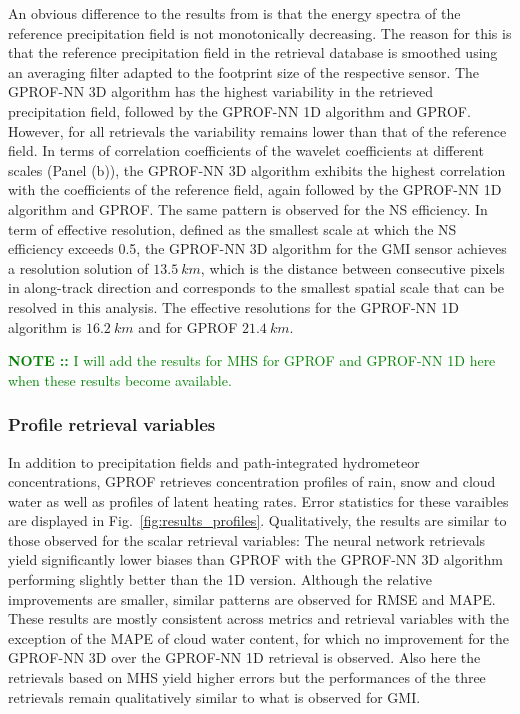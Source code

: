 \documentclass[a4paper,11pt,bibtotoc]{scrartcl}
\newcommand\note[1]{\textcolor{green}{\textbf{NOTE :: }#1}}
\begin{document}
An obvious difference to the results from \citet{guilloteau17} is that the
energy spectra of the reference precipitation field is not monotonically
decreasing. The reason for this is that the reference precipitation field in the
retrieval database is smoothed using an averaging filter adapted to the
footprint size of the respective sensor. The GPROF-NN 3D algorithm has the
highest variability in the retrieved precipitation field, followed by the
GPROF-NN 1D algorithm and GPROF. However, for all retrievals the variability
remains lower than that of the reference field. In terms of correlation
coefficients of the wavelet coefficients at different scales (Panel (b)), the
GPROF-NN 3D algorithm exhibits the highest correlation with the coefficients of
the reference field, again followed by the GPROF-NN 1D algorithm and GPROF. The
same pattern is observed for the NS efficiency. In term of effective resolution,
defined as the smallest scale at which the NS efficiency exceeds 0.5, the
GPROF-NN 3D algorithm for the GMI sensor achieves a resolution solution of
$13.5\ \unit{km}$, which is the distance between consecutive pixels in
along-track direction and corresponds to the smallest spatial scale that can be
resolved in this analysis. The effective resolutions for the GPROF-NN 1D
algorithm is $16.2\ \unit{km}$ and for GPROF $21.4\ \unit{km}$.

\note{I will add the results for MHS for GPROF and GPROF-NN 1D here when these
  results become available.}

\subsubsection{Profile retrieval variables}

In addition to precipitation fields and path-integrated hydrometeor
concentrations, GPROF retrieves concentration profiles of rain, snow and cloud
water as well as profiles of latent heating rates. Error statistics for these
varaibles are displayed in Fig.~\ref{fig:results_profiles}. Qualitatively, the
results are similar to those observed for the scalar retrieval variables: The
neural network retrievals yield significantly lower biases than GPROF with the
GPROF-NN 3D algorithm performing slightly better than the 1D version. Although
the relative improvements are smaller, similar patterns are observed for RMSE
and MAPE. These results are mostly consistent across metrics and retrieval
variables with the exception of the MAPE of cloud water content, for which no
improvement for the GPROF-NN 3D over the GPROF-NN 1D retrieval is observed. Also
here the retrievals based on MHS yield higher errors but the performances of the
three retrievals remain qualitatively similar to what is observed for GMI.
\end{document}
